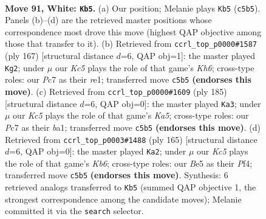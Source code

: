 \documentclass[11pt]{article}
\begin{document}
\clearpage

\begin{figure}[p]\centering
\begin{subfigure}{0.46\textwidth}\centering
\resizebox{\linewidth}{!}{%
\newchessgame
\chessboard[
  setfen={5k2/2P5/8/2K1B3/8/8/8/8 w - - 7 91},
  showmover=false,
  pgfstyle=straightmove, color=movearrow, markmove={c5-b5}
]}
\caption{}
\end{subfigure}\hfill
\begin{subfigure}{0.46\textwidth}\centering
\resizebox{\linewidth}{!}{%
\newchessgame
\chessboard[
  setfen={8/8/8/8/5b2/7k/2K5/4R3 b - - 20 84},
  showmover=false,
  pgfstyle=straightmove, color=movearrow, markmove={h3-g2}
]}
\caption{}
\end{subfigure}
\\[4pt]
\begin{subfigure}{0.46\textwidth}\centering
\resizebox{\linewidth}{!}{%
\newchessgame
\chessboard[
  setfen={8/8/6b1/8/k7/8/8/B1K5 b - - 7 93},
  showmover=false,
  pgfstyle=straightmove, color=movearrow, markmove={a4-a3}
]}
\caption{}
\end{subfigure}\hfill
\begin{subfigure}{0.46\textwidth}\centering
\resizebox{\linewidth}{!}{%
\newchessgame
\chessboard[
  setfen={8/8/8/8/5p2/1k6/8/3K4 b - - 7 83},
  showmover=false,
  pgfstyle=straightmove, color=movearrow, markmove={b3-a2}
]}
\caption{}
\end{subfigure}
\caption{\textbf{Move 91, White: \texttt{Kb5}.} (a) Our position; Melanie plays \texttt{Kb5} (\texttt{c5b5}). Panels (b)--(d) are the retrieved master positions whose correspondence most drove this move (highest QAP objective among those that transfer to it). (b) Retrieved from \texttt{ccrl\_top\_p0000\#1587} (ply 167) [structural distance $d$=6, QAP obj=1]: the master played \texttt{Kg2}; under $\mu$ our \emph{Kc5} plays the role of that game's \emph{Kh6}; cross-type roles: our \emph{P}c7 as their \emph{r}e1; transferred move \texttt{c5b5} \textbf{(endorses this move)}. (c) Retrieved from \texttt{ccrl\_top\_p0000\#1609} (ply 185) [structural distance $d$=6, QAP obj=0]: the master played \texttt{Ka3}; under $\mu$ our \emph{Kc5} plays the role of that game's \emph{Ka5}; cross-type roles: our \emph{P}c7 as their \emph{b}a1; transferred move \texttt{c5b5} \textbf{(endorses this move)}. (d) Retrieved from \texttt{ccrl\_top\_p0003\#1488} (ply 165) [structural distance $d$=6, QAP obj=0]: the master played \texttt{Ka2}; under $\mu$ our \emph{Kc5} plays the role of that game's \emph{Kb6}; cross-type roles: our \emph{B}e5 as their \emph{P}f4; transferred move \texttt{c5b5} \textbf{(endorses this move)}. Synthesis: 6 retrieved analogs transferred to \texttt{Kb5} (summed QAP objective 1, the strongest correspondence among the candidate moves); Melanie committed it via the \texttt{search} selector.}
\label{fig:thought-m180}
\end{figure}
\end{document}
